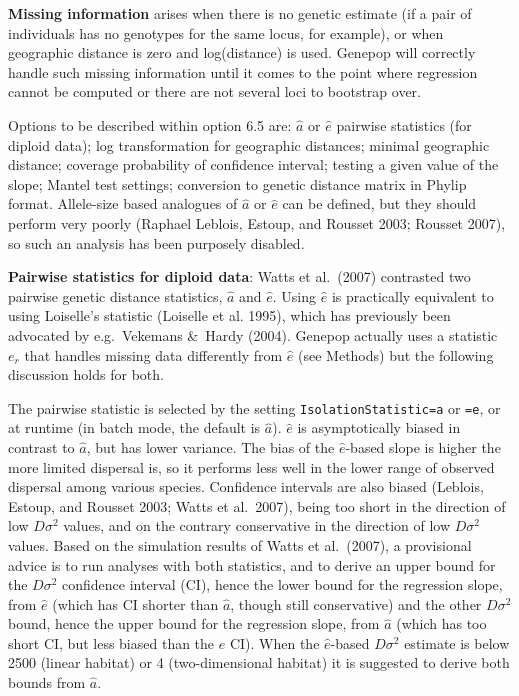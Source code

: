 \documentclass[
  12pt,
]{book}
\begin{document}
\textbf{Missing information} arises when there is no genetic estimate (if a pair of individuals has no genotypes for the same locus, for example), or when geographic distance is zero and log(distance) is used. Genepop will correctly handle such missing information until it comes to the point where regression cannot be computed or there are not several loci to bootstrap over.

Options to be described within option 6.5 are: \(\hat{a}\) or \(\hat{e}\) pairwise statistics (for diploid data); log transformation for geographic distances; minimal geographic distance; coverage probability of confidence interval; testing a given value of the slope; Mantel test settings; conversion to genetic distance matrix in Phylip format. Allele-size based analogues of \(\hat{a}\) or \(\hat{e}\) can be defined, but they should perform very poorly (Raphael Leblois, Estoup, and Rousset 2003; Rousset 2007), so such an analysis has been purposely disabled.

\textbf{Pairwise statistics for diploid data}:
Watts et al.~(2007) contrasted two pairwise genetic distance statistics, \(\hat{a}\) and \(\hat{e}\). Using \(\hat{e}\) is practically equivalent to using Loiselle's statistic
(Loiselle et al. 1995), which has previously been
advocated by e.g.~Vekemans \&~Hardy (2004). Genepop actually uses a
statistic \(e_r\) that handles missing data differently from \(\hat{e}\)
(see Methods) but the following discussion holds for both.

The pairwise statistic is selected by the setting \texttt{IsolationStatistic=a} or \texttt{=e}, or at runtime (in batch mode, the default is \(\hat{a}\)).
\(\hat{e}\) is asymptotically biased in contrast to \(\hat{a}\), but has lower
variance. The bias of the \(\hat{e}\)-based slope is higher the more
limited dispersal is, so it performs less well in the lower range of
observed dispersal among various species. Confidence intervals are also
biased (Leblois, Estoup, and Rousset 2003; Watts et al.~2007), being too
short in the direction of low \(D\sigma^2\) values, and on the contrary
conservative in the direction of low \(D\sigma^2\) values. Based on the
simulation results of Watts et al.~(2007), a provisional advice is to
run analyses with both statistics, and to derive an upper bound for the
\(D\sigma^2\) confidence interval (CI), hence the lower bound for the
regression slope, from \(\hat{e}\) (which has CI shorter than
\(\hat{a}\), though still conservative) and the other \(D\sigma^2\)
bound, hence the upper bound for the regression slope, from \(\hat{a}\)
(which has too short CI, but less biased than the \(\hat{e}\) CI). When
the \(\hat{e}\)-based \(D\sigma^2\) estimate is below 2500 (linear
habitat) or 4 (two-dimensional habitat) it is suggested to derive both
bounds from \(\hat{a}\).
\end{document}
